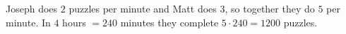 Joseph does $2$ puzzles per minute and Matt does $3$, so together they do $5$ per minute. In $4$ hours $=240$ minutes they complete $5\cdot240=\boxed{1200}$ puzzles.

